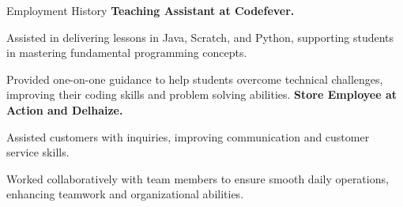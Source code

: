 \begin{rubric}{Employment History}
    \entry*[2023 - To Date]%
        \textbf{Teaching Assistant at Codefever.}\par
        Assisted in delivering lessons in Java, Scratch, and Python, 
        supporting students in mastering fundamental programming 
        concepts.
        \par
        Provided one-on-one guidance to help students overcome 
        technical challenges, improving their coding skills and problem
        solving abilities. 
    \entry*[2021 -- To Date]%
        \textbf{Store Employee at Action and Delhaize.}\par
        Assisted customers with inquiries, improving communication and 
        customer service skills. 
        \par
        Worked collaboratively with team members to ensure smooth 
        daily operations, enhancing teamwork and organizational 
        abilities.
    \end{rubric}